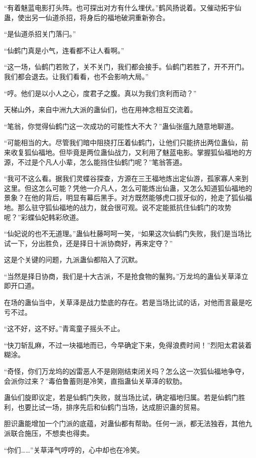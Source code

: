 \begin{this_body}
“有着魅蓝电影打头阵。也可探出对方有什么埋伏。”鹤风扬说着。又催动拓宇仙蛊，使出另一仙道杀招，将身后的福地破洞重新弥合。

“是仙道杀招关门落闩。”

“仙鹤门真是小气，连看都不让人看啊。”

“这一场，仙鹤门若败了，关不关门，我们都会接手。仙鹤门若胜了，开不开门。我们都会退去。让我们看看，也不会影响大局。”

“哼。他们是以小人之心，度君子之腹。真以为我们贪利而动？”

天梯山外，来自中洲九大派的蛊仙们，也在用神念相互交流着。

“笔翁，你觉得仙鹤门这一次成功的可能性大不大？”蛊仙张瘟九随意地聊道。

“可能相当的大。尽管我们暗中阻挠打压着仙鹤门，让他们只能挤出两位蛊仙，前来收复狐仙福地。但毕竟是两位蛊仙战力，又利用了魅蓝电影。掌握狐仙福地的方源，不过是个凡人小辈，怎么能挡住仙鹤门呢？”笔翁答道。

“我可不这么看。据我们灵蝶谷探查，方源在三王福地炼出定仙游，孤家寡人来到这里。但这怎么可能？凭他一介凡人，怎么可能炼出仙蛊，又怎么知道狐仙福地的景象？在他的背后，明显有幕后黑手。对方既然能够虎口拔牙似的，抢走了狐仙福地。那么驻守狐仙福地的战力，就会很可观。说不定能抵抗住仙鹤门的攻势呢？”彩蝶仙妃韩彩欣道。

“仙妃说的也不无道理。”蛊仙杜藤呵呵一笑，“如果这次仙鹤门失败，我们是当场比试一下，分出胜负，还是择日十派协商好，再来定夺？”

这是个关键的问题，九派蛊仙都陷入了沉默。

“当然是择日协商，我们是十大古派，不是抢食物的鬣狗。”万龙坞的蛊仙关草泽立即开口道。

在场的蛊仙当中，关草泽是战力垫底的存在。若是当场比试的话，对他而言最是吃亏不过。

“这不好，这不好。”青鸾童子摇头不止。

“快刀斩乱麻，不过一块福地而已，今早确定下来，免得浪费时间！”烈阳太君装着糊涂。

“奇怪，你们万龙坞的凶雷恶人不是刚刚结束闭关吗？怎么这一次狐仙福地争夺，会派你过来？”毒伯鲁蓄则是冷笑，直指蛊仙关草泽的软肋。

蛊仙们旋即议定，若是仙鹤门失败，就当场比试，确定福地归属。若是仙鹤门胜利，也要比试一场，排序先后和仙鹤门当场，达成胆识蛊的贸易。

胆识蛊能增加一个门派的底蕴，对蛊仙都有帮助。任何一派，都无法独吞，其他九派联合施压，不想卖也得卖。

“你们……”关草泽气哼哼的，心中却也在冷笑。


\end{this_body}
